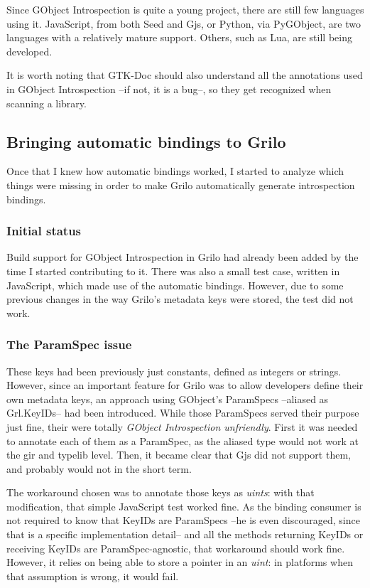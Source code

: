 Since GObject Introspection is quite a young project, there are still few languages using it. JavaScript, from both
Seed and Gjs, or Python, via PyGObject, are two languages with a relatively mature support. Others, such as Lua, are
still being developed.

It is worth noting that GTK-Doc should also understand all the annotations used in
GObject Introspection --if not, it is a bug--, so they get recognized when scanning
a library.

\subsection{Bringing automatic bindings to Grilo}

Once that I knew how automatic bindings worked, I started to analyze which things
were missing in order to make Grilo automatically generate introspection bindings.

\subsubsection{Initial status}

Build support for GObject Introspection in Grilo had already been added by the time
I started contributing to it. There was also a small test case, written in JavaScript,
which made use of the automatic bindings. However, due to some previous changes in
the way Grilo's metadata keys were stored, the test did not work.

\subsubsection{The ParamSpec issue}

These keys had been previously just constants, defined as integers or strings. However,
since an important feature for Grilo was to allow developers define their own metadata
keys, an approach using GObject's ParamSpecs --aliased as Grl.KeyIDs--
had been introduced. While those ParamSpecs served their purpose just fine, 
their were totally {\it GObject Introspection unfriendly}. First it was needed
to annotate each of them as a ParamSpec, as the aliased type would not work at the
gir and typelib level. Then, it became clear that Gjs did not support them, and
probably would not in the short term.

The workaround chosen was to annotate those keys as {\it uints}: with that modification,
that simple JavaScript test worked fine. As the binding consumer is not required to know
that KeyIDs are ParamSpecs --he is even discouraged, since that is a specific implementation
detail-- and all the methods returning KeyIDs or receiving KeyIDs are ParamSpec-agnostic,
that workaround should work fine. However, it relies on being able to store a pointer
in an {\it uint}: in platforms when that assumption is wrong, it would fail.

